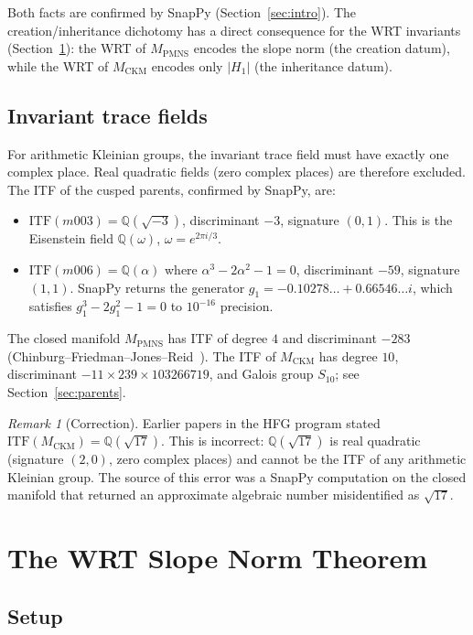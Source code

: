 \documentclass[11pt,a4paper]{article}
\theoremstyle{definition}
\theoremstyle{remark}
\newtheorem{remark}[theorem]{Remark}
\newcommand{\MPMNS}{M_{\mathrm{PMNS}}}
\newcommand{\MCKM}{M_{\mathrm{CKM}}}
\newcommand{\QQ}{\mathbb{Q}}
\newcommand{\ITF}{\mathrm{ITF}}
\begin{document}
\noindent Both facts are confirmed by SnapPy (Section~\ref{sec:intro}).
The creation/inheritance dichotomy has a direct consequence for the
WRT invariants (Section~\ref{sec:wrt}): the WRT of $\MPMNS$ encodes
the slope norm (the creation datum), while the WRT of $\MCKM$ encodes
only $|H_1|$ (the inheritance datum).

\subsection{Invariant trace fields}

For arithmetic Kleinian groups, the invariant trace field must have
exactly one complex place.
Real quadratic fields (zero complex places) are therefore excluded.
The ITF of the cusped parents, confirmed by SnapPy, are:
\begin{itemize}
\item $\ITF(m003) = \QQ(\sqrt{-3})$, discriminant $-3$, signature $(0,1)$.
  This is the Eisenstein field $\QQ(\omega)$, $\omega = e^{2\pi i/3}$.
\item $\ITF(m006) = \QQ(\alpha)$ where $\alpha^3 - 2\alpha^2 - 1 = 0$,
  discriminant $-59$, signature $(1,1)$.
  SnapPy returns the generator $g_1 = -0.10278\ldots + 0.66546\ldots i$,
  which satisfies $g_1^3 - 2g_1^2 - 1 = 0$ to $10^{-16}$ precision.
\end{itemize}
The closed manifold $\MPMNS$ has ITF of degree $4$ and discriminant $-283$
(Chinburg--Friedman--Jones--Reid~\cite{Chinburg01}).
The ITF of $\MCKM$ has degree $10$, discriminant
$-11\times239\times103266719$, and Galois group $S_{10}$;
see Section~\ref{sec:parents}.

\begin{remark}[Correction]
Earlier papers in the HFG program stated $\ITF(\MCKM) = \QQ(\sqrt{17})$.
This is incorrect: $\QQ(\sqrt{17})$ is real quadratic (signature $(2,0)$,
zero complex places) and cannot be the ITF of any arithmetic Kleinian group.
The source of this error was a SnapPy computation on the closed manifold
that returned an approximate algebraic number misidentified as $\sqrt{17}$.
\end{remark}

\section{The WRT Slope Norm Theorem}
\label{sec:wrt}

\subsection{Setup}
\end{document}
